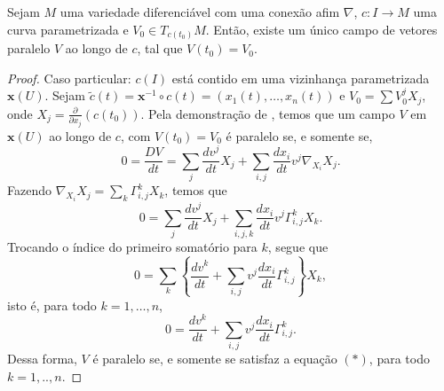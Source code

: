\begin{proposition}
    \label{loc:2.6_:_prop_2_:_transporte_paralelo}
    Sejam $M$ uma variedade diferenciável com uma conexão afim $\nabla$, $c:I\to M$ uma curva parametrizada e $V_{0} \in T_{c(t_{0})}M$. Então, existe um único campo de vetores paralelo $V$ ao longo de $c$, tal que $V(t_{0})=V_{0}$.
    \begin{proof}

        Caso particular: $c(I)$ está contido em uma vizinhança parametrizada $\mathbf{x}(U)$.
        Sejam $\tilde{c}(t)=\mathbf{x}^{-1} \circ c(t) = (x_{1}(t), \dots, x_{n}(t))$ e $V_{0}=\sum V_{0}^{j}X_{j}$, onde $X_{j}=\frac{\partial}{\partial x_{j}}(c(t_{0}))$.
        Pela demonstração de , temos que um campo $V$ em $\mathbf{x}(U)$ ao longo de $c$, com $V(t_{0})=V_{0}$ é paralelo se, e somente se,
        \begin{equation*}
            0=\frac{DV}{dt}=\sum_{j}\frac{dv^{j}}{dt}X_{j}+\sum_{i,j}\frac{dx_{i}}{dt}v^{j}\nabla_{X_{i}}X_{j}.
        \end{equation*}
        Fazendo $\nabla_{X_{i}}X_{j}=\sum_{k}\Gamma_{i,j}^{k}X_{k}$, temos que
        \begin{equation*}
            0=\sum_{j}\frac{dv^{j}}{dt}X_{j}+\sum_{i,j,k}\frac{dx_{i}}{dt}v^{j}\Gamma_{i,j}^{k}X_{k}.
        \end{equation*}
        Trocando o índice do primeiro somatório para $k$, segue que
        \begin{equation*}
            0=\sum_{k}\left\{  \frac{dv^{k}}{dt}+\sum_{i,j}v^{j}\frac{dx_{i}}{dt}\Gamma_{i,j}^{k}  \right\}X_{k},
        \end{equation*}
        isto é, para todo $k=1, \dots, n$,
        \begin{equation*}
            0=\frac{dv^{k}}{dt}+\sum_{i,j}v^{j}\frac{dx_{i}}{dt}\Gamma_{i,j}^{k}. \tag{*}
        \end{equation*}
        Dessa forma, $V$ é paralelo se, e somente se satisfaz a equação $(*)$, para todo $k=1, .., n$.


\end{proof}
\end{proposition}
